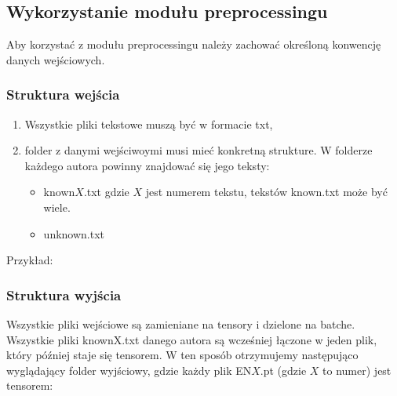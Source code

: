\newpage
\subsection{Wykorzystanie modułu preprocessingu}

Aby korzystać z modułu preprocessingu należy zachować określoną konwencję danych wejściowych. 

\subsubsection{Struktura wejścia}

\begin{enumerate}
	\item Wszystkie pliki tekstowe muszą być w formacie txt,
	\item folder z danymi wejściwoymi musi mieć konkretną strukture. W folderze każdego autora
		  powinny znajdować się jego teksty: 
			\begin{itemize}
				\item known$X$.txt gdzie $X$ jest numerem tekstu, tekstów known.txt może być wiele.
				\item unknown.txt
			\end{itemize}
\end{enumerate}

Przykład: 

\myspace
{}
\myspace

\newpage
\subsubsection{Struktura wyjścia}

Wszystkie pliki wejściowe są zamieniane na tensory i dzielone na batche. Wszystkie pliki knownX.txt 
danego autora są wcześniej łączone w jeden plik, który później staje się tensorem. W ten sposób 
otrzymujemy następująco wyglądający folder wyjściowy, gdzie każdy plik EN$X$.pt (gdzie $X$ to numer)
 jest tensorem:

\myspace
{}
\myspace


